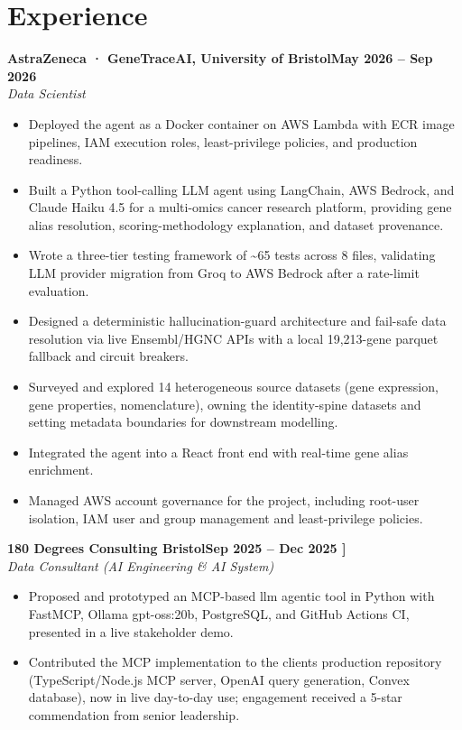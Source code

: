 \documentclass[a4paper,11pt]{article}
\newcommand{\entry}[4]{\needspace{4\baselineskip}\noindent\textbf{#1}\hfill\textbf{#2}\\ \textit{#3}\hfill\textit{#4}\par}
\begin{document}
\section{Experience}
\entry{AstraZeneca · GeneTraceAI, University of Bristol}{May 2026 – Sep 2026}{Data Scientist}{}
\begin{itemize}
  \item Deployed the agent as a Docker container on AWS Lambda with ECR image pipelines, IAM execution roles, least-privilege policies, and production readiness.
  \item Built a Python tool-calling LLM agent using LangChain, AWS Bedrock, and Claude Haiku 4.5 for a multi-omics cancer research platform, providing gene alias resolution, scoring-methodology explanation, and dataset provenance.
  \item Wrote a three-tier testing framework of \textasciitilde{}65 tests across 8 files, validating LLM provider migration from Groq to AWS Bedrock after a rate-limit evaluation.
  \item Designed a deterministic hallucination-guard architecture and fail-safe data resolution via live Ensembl/HGNC APIs with a local 19,213-gene parquet fallback and circuit breakers.
  \item Surveyed and explored 14 heterogeneous source datasets (gene expression, gene properties, nomenclature), owning the identity-spine datasets and setting metadata boundaries for downstream modelling.
  \item Integrated the agent into a React front end with real-time gene alias enrichment.
  \item Managed AWS account governance for the project, including root-user isolation, IAM user and group management and least-privilege policies.
\end{itemize}
\vspace{4pt}
\entry{180 Degrees Consulting Bristol}{Sep 2025 – Dec 2025   ]}{Data Consultant (AI Engineering \& AI System)}{}
\begin{itemize}
  \item Proposed and prototyped an MCP-based llm agentic tool in Python with FastMCP, Ollama gpt-oss:20b, PostgreSQL, and GitHub Actions CI, presented in a live stakeholder demo.
  \item Contributed the MCP implementation to the client\textquotesingle{}s production repository (TypeScript/Node.js MCP server, OpenAI query generation, Convex database), now in live day-to-day use; engagement received a 5-star commendation from senior leadership.
\end{itemize}
\end{document}
